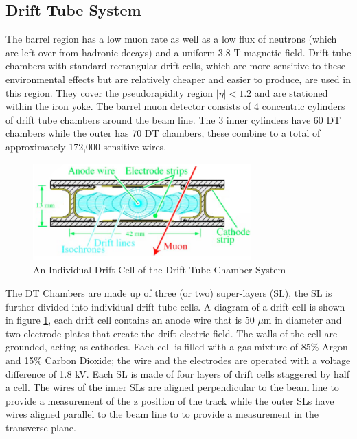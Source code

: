 \subsection{Drift Tube System}
The barrel region has a low muon rate as well as a low flux of neutrons (which are left over 
from hadronic decays) and a uniform 3.8 T magnetic field. 
Drift tube chambers with standard rectangular drift cells, 
which are more sensitive to these environmental effects but are 
relatively cheaper and easier to produce, are used in this region. 
They cover the pseudorapidity region $|\eta|<1.2$ and are stationed within 
the iron yoke. The barrel muon detector consists of 4 concentric
cylinders of drift tube chambers around the beam line. The 3 inner
cylinders have 60 DT chambers while the outer has 70 DT chambers,
these combine to a total of approximately 172,000 sensitive wires.
\begin{figure}[hb]
  \centering
	\includegraphics[width=0.75\textwidth]{images/driftCell.png}
  	\caption[Individual Drift Cell]
   	{An Individual Drift Cell of the Drift Tube Chamber System}
	\label{fig:driftCell}
\end{figure}
The DT Chambers are made up of three (or two) super-layers (SL), the 
SL is further divided into individual drift tube cells. 
A diagram of a drift cell is shown in figure \ref{fig:driftCell},
each drift cell contains an anode wire that is 50 $\mu$m in diameter
and two electrode plates that create the drift electric field. The walls
of the cell are grounded, acting as cathodes. Each cell is filled with a gas
mixture of 85\% Argon and 15\% Carbon Dioxide; the wire and the
electrodes are operated with a voltage difference of 1.8 kV. Each
SL is made of four layers of drift cells staggered by half a cell.
The wires of the inner SLs are aligned perpendicular to the beam line
to provide a measurement of the z position of the track while the 
outer SLs have wires aligned parallel to the beam line to 
to provide a measurement in the transverse plane. 

